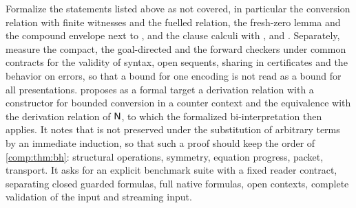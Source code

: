 \begin{question}
Formalize the statements listed above as not covered, in particular the
conversion relation with finite witnesses and the fuelled relation, the
fresh-zero lemma and the compound envelope next to , and
the clause calculi with ,  and
. Separately, measure the compact, the goal-directed and the
forward checkers under common contracts for the validity of syntax, open
sequents, sharing in certificates and the behavior on errors, so that a
bound for one encoding is not read as a bound for all presentations.
 proposes as a formal target a derivation relation
with a constructor for bounded conversion in a counter context and the
equivalence with the derivation relation of $\mathsf{N}$, to which the formalized
bi-interpretation then applies. It notes that  is not
preserved under the substitution of arbitrary terms by an immediate
induction, so that such a proof should keep the order of
\cref{comp:thm:bh}: structural operations, symmetry, equation progress,
packet, transport. It asks for an explicit benchmark suite with a fixed
reader contract, separating closed guarded formulas, full native formulas,
open contexts, complete validation of the input and streaming input.
\end{question}

